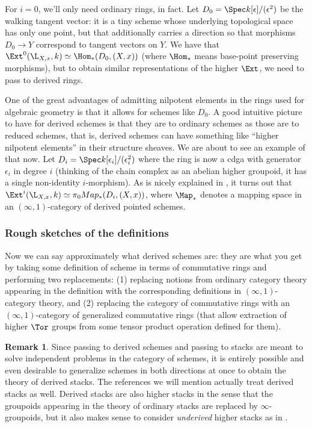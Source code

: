 \documentclass[12pt]{amsart}
\theoremstyle{definition} \newtheorem{definition}[theorem]{Definition}
\newtheorem{remark}[theorem]{Remark}
\numberwithin{equation}{section}
\newcommand{\oo}{\infty}
\newcommand{\io}{$(\oo,1)$}
\begin{document}
For $i=0$, we'll only need ordinary rings, in fact. Let $D_0 = \Spec
k[\epsilon]/(\epsilon^2)$ be the walking tangent vector: it is a tiny
scheme whose underlying topological space has only one point, but that
additionally carries a direction so that morphisms $D_0 \to Y$
correspond to tangent vectors on $Y$.  We have that $\Ext^0(\L_{X,x},
k) \simeq \Hom_\ast(D_0, (X,x))$ (where $\Hom_\ast$ means base-point
preserving morphisms), but to obtain similar representations of the
higher $\Ext$, we need to pass to derived rings.

One of the great advantages of admitting nilpotent elements in the
rings used for algebraic geometry is that it allows for schemes like
$D_0$. A good intuitive picture to have for derived schemes is that
they are to ordinary schemes as those are to reduced schemes, that is,
derived schemes can have something like ``higher nilpotent elements''
in their structure sheaves. We are about to see an example of that
now. Let $D_i = \Spec k[\epsilon_i]/(\epsilon_i^2)$ where the ring is
now a cdga with generator $\epsilon_i$ in degree $i$ (thinking of the
chain complex as an abelian higher groupoid, it has a single
non-identity $i$-morphism). As is nicely explained in \cite{VezzosiL},
it turns out that $\Ext^i(\L_{X,x}, k) \simeq \pi_0 Map_\ast(D_i,
(X,x))$, where $\Map_\ast$ denotes a mapping space in an \io-category
of derived pointed schemes.

\subsubsection{Rough sketches of the definitions}

Now we can say approximately what derived schemes are: they are what
you get by taking some definition of scheme in terms of commutative
rings and performing two replacements: (1) replacing notions from
ordinary category theory appearing in the definition with the
corresponding definitions in \io-category theory, and (2) replacing
the category of commutative rings with an \io-category of generalized
commutative rings (that allow extraction of higher $\Tor$ groups from
some tensor product operation defined for them).

\begin{remark}
  Since passing to derived schemes and passing to stacks are meant
  to solve independent problems in the category of schemes, it is
  entirely possible and even desirable to generalize schemes in both
  directions at once to obtain the theory of derived stacks.
  The references we will mention actually treat derived stacks as well.
  Derived stacks are also higher stacks in the sense that
  the groupoids appearing in the theory of ordinary stacks are
  replaced by $\oo$-groupoids, but it also makes sense to consider
  \emph{underived} higher stacks as in \cite{SimpsonStacks}.
\end{remark}
\end{document}
